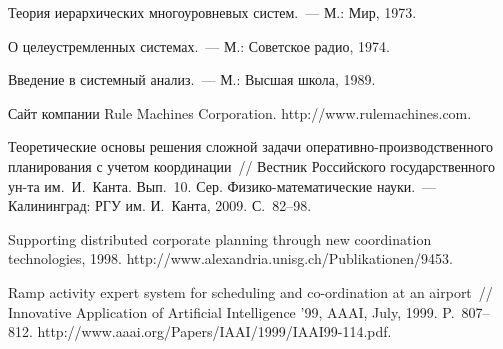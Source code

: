 \begin{multicols}{2}
{{\begin{thebibliography}{99}
Теория иерархических многоуровневых систем.~--- М.: Мир, 1973.


О целеустремленных системах.~--- М.: Советское радио, 1974.

Введение в системный анализ.~--- М.: Высшая школа, 1989.

Сайт компании Rule Machines Corporation. {\sf http://\linebreak www.rulemachines.com}.

Теоретические основы решения сложной задачи оперативно-про\-из\-вод\-ст\-вен\-но\-го 
планирования с учетом координации~// Вестник Российского государственного ун-та им.\ 
И.~Канта. Вып.~10. Сер. Физико-математические науки.~--- Калининград: РГУ им. 
И.~Канта, 2009. С.~82--98.

Supporting distributed corporate planning through new coordination technologies, 1998. {\sf 
http://\linebreak www.alexandria.unisg.ch/Publikationen/9453}.



 \label{end\stat}
 
Ramp activity expert system for scheduling and co-ordination at an airport~// Innovative 
Application of Artificial Intelligence '99, AAAI, July, 1999. P.~807--812. {\sf 
http://www.aaai.org/Papers/IAAI/1999/IAAI99-114.pdf}.


 \end{thebibliography}
}
}


\end{multicols}